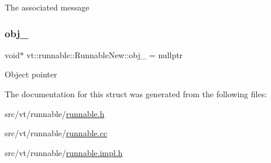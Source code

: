 The associated message \mbox{\label{structvt_1_1runnable_1_1_runnable_new_a42f58780340fa1ddc789aad23daaca7d}} 
\subsubsection{\texorpdfstring{obj\+\_\+}{obj\_}}
{\footnotesize\ttfamily void$\ast$ vt\+::runnable\+::\+Runnable\+New\+::obj\+\_\+ = nullptr\hspace{0.3cm}{\ttfamily [private]}}

Object pointer 

The documentation for this struct was generated from the following files\+:\begin{DoxyCompactItemize}
\item 
src/vt/runnable/\hyperlink{runnable_8h}{runnable.\+h}\item 
src/vt/runnable/\hyperlink{runnable_8cc}{runnable.\+cc}\item 
src/vt/runnable/\hyperlink{runnable_8impl_8h}{runnable.\+impl.\+h}\end{DoxyCompactItemize}
